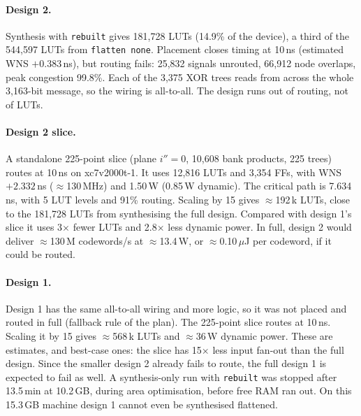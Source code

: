 \documentclass[10pt]{article}
\begin{document}
\paragraph{Design 2.} Synthesis with \texttt{rebuilt} gives 181,728 LUTs (14.9\% of the device), a third of the 544,597 LUTs from \texttt{flatten none}. Placement closes timing at 10\,ns (estimated WNS $+0.383$\,ns), but routing fails: 25,832 signals unrouted, 66,912 node overlaps, peak congestion 99.8\%. Each of the 3,375 XOR trees reads from across the whole 3,163-bit message, so the wiring is all-to-all. The design runs out of routing, not of LUTs.

\paragraph{Design 2 slice.} A standalone 225-point slice (plane $i''=0$, 10,608 bank products, 225 trees) routes at 10\,ns on xc7v2000t-1. It uses 12,816 LUTs and 3,354 FFs, with WNS $+2.332$\,ns ($\approx$130\,MHz) and 1.50\,W (0.85\,W dynamic). The critical path is 7.634\,ns, with 5 LUT levels and 91\% routing. Scaling by 15 gives $\approx$192\,k LUTs, close to the 181,728 LUTs from synthesising the full design. Compared with design 1's slice it uses 3$\times$ fewer LUTs and 2.8$\times$ less dynamic power. In full, design 2 would deliver $\approx$130\,M codewords/s at $\approx$13.4\,W, or $\approx$0.10\,$\mu$J per codeword, if it could be routed.

\paragraph{Design 1.} Design 1 has the same all-to-all wiring and more logic, so it was not placed and routed in full (fallback rule of the plan). The 225-point slice routes at 10\,ns. Scaling it by 15 gives $\approx$568\,k LUTs and $\approx$36\,W dynamic power. These are estimates, and best-case ones: the slice has 15$\times$ less input fan-out than the full design. Since the smaller design 2 already fails to route, the full design 1 is expected to fail as well. A synthesis-only run with \texttt{rebuilt} was stopped after 13.5\,min at 10.2\,GB, during area optimisation, before free RAM ran out. On this 15.3\,GB machine design 1 cannot even be synthesised flattened.
\end{document}
